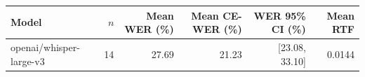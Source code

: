 \begin{tabular}{lrrrrr}
\toprule
Model & $n$ & Mean WER (\%) & Mean CE-WER (\%) & WER 95\% CI (\%) & Mean RTF \\
\midrule
openai/whisper-large-v3 & 14 & 27.69 & 21.23 & [23.08, 33.10] & 0.0144 \\
\bottomrule
\end{tabular}
